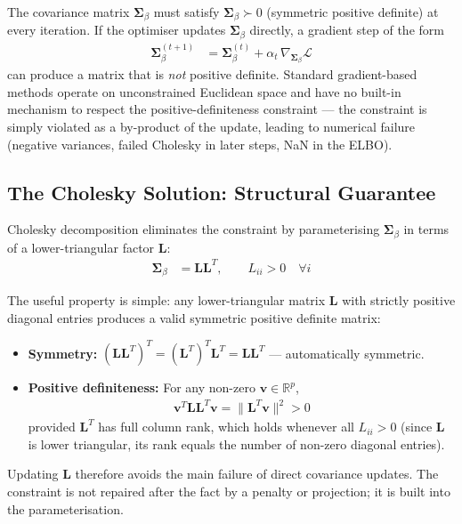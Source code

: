 \documentclass[11pt,a4paper]{article}
\newcommand{\R}{\mathbb{R}}
\begin{document}
The covariance matrix $\bm{\Sigma}_\beta$ must satisfy $\bm{\Sigma}_\beta \succ 0$ (symmetric positive definite) at every iteration. If the optimiser updates $\bm{\Sigma}_\beta$ directly, a gradient step of the form
\begin{align}
  \bm{\Sigma}_\beta^{(t+1)} &= \bm{\Sigma}_\beta^{(t)} + \alpha_t \,\nabla_{\bm{\Sigma}_\beta}\mathcal{L}
\end{align}
can produce a matrix that is \emph{not} positive definite. Standard gradient-based methods operate on unconstrained Euclidean space and have no built-in mechanism to respect the positive-definiteness constraint --- the constraint is simply violated as a by-product of the update, leading to numerical failure (negative variances, failed Cholesky in later steps, NaN in the ELBO).

\subsection*{The Cholesky Solution: Structural Guarantee}

Cholesky decomposition eliminates the constraint by parameterising $\bm{\Sigma}_\beta$ in terms of a lower-triangular factor $\bm{L}$:
\begin{align}
  \bm{\Sigma}_\beta &= \bm{L}\bm{L}^T, \qquad L_{ii} > 0 \quad \forall i
\end{align}

The useful property is simple: any lower-triangular matrix $\bm{L}$ with strictly positive diagonal entries produces a valid symmetric positive definite matrix:

\begin{itemize}
  \item \textbf{Symmetry:} $(\bm{L}\bm{L}^T)^T = (\bm{L}^T)^T\bm{L}^T = \bm{L}\bm{L}^T$ \quad --- automatically symmetric.
  \item \textbf{Positive definiteness:} For any non-zero $\bm{v} \in \R^p$,
  \begin{align}
    \bm{v}^T \bm{L}\bm{L}^T \bm{v} = \|\bm{L}^T\bm{v}\|^2 > 0
  \end{align}
  provided $\bm{L}^T$ has full column rank, which holds whenever all $L_{ii} > 0$ (since $\bm{L}$ is lower triangular, its rank equals the number of non-zero diagonal entries).
\end{itemize}

Updating $\bm{L}$ therefore avoids the main failure of direct covariance updates. The constraint is not repaired after the fact by a penalty or projection; it is built into the parameterisation.
\end{document}
